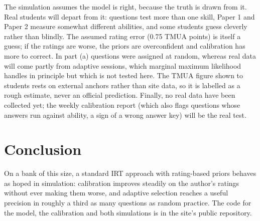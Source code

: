 \documentclass[11pt,a4paper]{article}
\begin{document}
The simulation assumes the model is right, because the truth is drawn from it. Real students will depart from it: questions test more than one skill, Paper 1 and Paper 2 measure somewhat different abilities, and some students guess cleverly rather than blindly. The assumed rating error (0.75 TMUA points) is itself a guess; if the ratings are worse, the priors are overconfident and calibration has more to correct. In part (a) questions were assigned at random, whereas real data will come partly from adaptive sessions, which marginal maximum likelihood handles in principle but which is not tested here. The TMUA figure shown to students rests on external anchors rather than site data, so it is labelled as a rough estimate, never an official prediction. Finally, no real data have been collected yet; the weekly calibration report (which also flags questions whose answers run against ability, a sign of a wrong answer key) will be the real test.

\section{Conclusion}

On a bank of this size, a standard IRT approach with rating-based priors behaves as hoped in simulation: calibration improves steadily on the author's ratings without ever making them worse, and adaptive selection reaches a useful precision in roughly a third as many questions as random practice. The code for the model, the calibration and both simulations is in the site's public repository.
\end{document}
